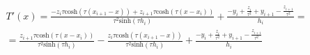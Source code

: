 \documentclass{article}
\begin{document}
  \begin{multline*}
    T'(x) =
           \frac{
             -z_i\tau\mathrm{cosh}(\tau(x_{i+1}-x)) +
             z_{i+1}\tau\textrm{cosh}(\tau(x-x_{i}))
           }
           {
             \tau^2\textrm{sinh}(\tau h_i)
           }
           +
           \frac {
             -y_i+\frac{z_i}{\tau^2} +
             y_{i+1}-\frac{z_{i+1}}{\tau^2}
           }
           {
             h_i
           }
           =
           \\
           =
           \frac{
             z_{i+1}\tau\textrm{cosh}(\tau(x-x_{i}))
           }
           {
             \tau^2\textrm{sinh}(\tau h_i)
           }
           -
           \frac{
             z_i\tau\mathrm{cosh}(\tau(x_{i+1}-x))
           }
           {
             \tau^2\textrm{sinh}(\tau h_i)
           }
           +
           \frac {
             -y_i+\frac{z_i}{\tau^2} +
             y_{i+1}-\frac{z_{i+1}}{\tau^2}
           }
           {
             h_i
           }

\end{multline*}
\end{document}
